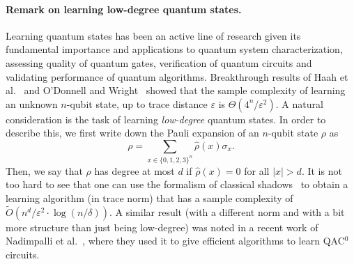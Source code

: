 \documentclass[11pt]{article}
\newcommand{\eps}{\varepsilon}
\theoremstyle{plain}
\theoremstyle{plain}
\theoremstyle{definition}
\theoremstyle{remark}
\theoremstyle{named}
\begin{document}
\paragraph{Remark on learning low-degree quantum states.}
Learning quantum states has been an active line of research given its fundamental importance and applications to quantum system characterization, assessing quality of quantum gates, verification of quantum circuits and validating performance of quantum algorithms. Breakthrough results of Haah et al.~\cite{haah2017sample} and O'Donnell and Wright~\cite{o2016efficient} showed that the sample complexity of learning an unknown $n$-qubit state, up to trace distance $\varepsilon$ is $\Theta(4^n/\varepsilon^2)$. 
A natural consideration is the task of learning \emph{low-degree} quantum states. 
In order to describe this, we first write down the Pauli expansion of an $n$-qubit state $\rho$  as
\begin{equation}\label{eq:PauliExpansion}
    \rho=\sum_{x\in \{0,1,2,3\}^n} \widehat\rho(x) \sigma_x.
\end{equation}
Then, we say that $\rho$ has degree at most $d$ if $\widehat\rho(x)=0$ for all $|x|>d$. 
It is not too hard to see that one can use the formalism of classical shadows~\cite{huang2020predicting} to obtain a learning algorithm (in trace norm)  that has a sample complexity of $\widetilde{O}(n^d/\eps^{2}\cdot \log(n/\delta))$. A similar result (with a different norm and with a bit more structure than just being low-degree) was noted in a recent work of Nadimpalli et al.~\cite{nadimpalli2023pauli}, where they used it to give efficient algorithms to learn QAC$^0$ circuits.
\end{document}
